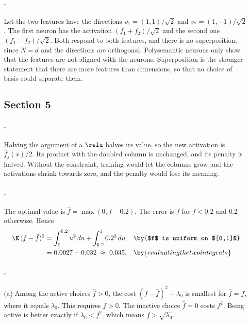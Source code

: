 {\paragraph{.}
Let the two features have the directions $v_1=(1,1)/\sqrt2$ and $v_2=(1,-1)/\sqrt2$. The first neuron has the
activation $(f_1+f_2)/\sqrt2$ and the second one $(f_1-f_2)/\sqrt2$. Both respond to both features, and there is no
superposition, since $N=d$ and the directions are orthogonal. Polysemantic neurons only show that the features
are not aligned with the neurons. Superposition is the stronger statement that there are more features than
dimensions, so that no choice of basis could separate them.

\subsection*{Section 5}

\paragraph{.}
Halving the argument of a $\relu$ halves its value, so the new activation is $\hat f_j(x)/2$. Its product with the
doubled column is unchanged, and its penalty is halved. Without the constraint, training would let the columns
grow and the activations shrink towards zero, and the penalty would lose its meaning.

\paragraph{.}
The optimal value is $\hat f=\max(0,f-0.2)$. The error is $f$ for $f<0.2$ and $0.2$ otherwise. Hence
\begin{align*}
\E\,(f-\hat f)^2 &= \int_0^{0.2}u^2\,du+\int_{0.2}^{1}0.2^2\,du && \by{$f$ is uniform on $[0,1]$}\\
&= 0.0027+0.032 \;\approx\; 0.035. && \by{evaluating the two integrals}
\end{align*}

\paragraph{.}
(a) Among the active choices $\hat f>0$, the cost $(f-\hat f)^2+\lambda_0$ is smallest for $\hat f=f$, where it
equals $\lambda_0$. This requires $f>0$. The inactive choice $\hat f=0$ costs $f^2$. Being active is better exactly
if $\lambda_0<f^2$, which means $f>\sqrt{\lambda_0}$.

}
